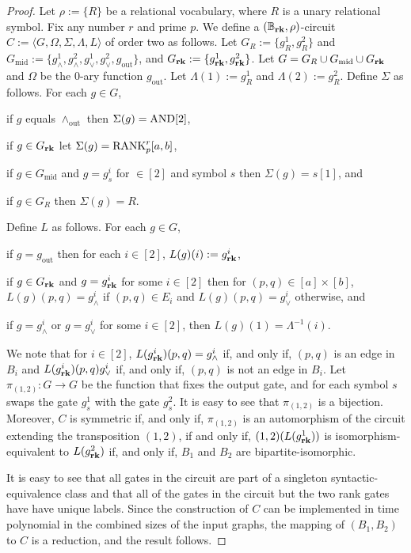 \documentclass[../paper.tex]{subfiles}
\begin{document}
\begin{proof}
  Let $\rho:= \{R\}$ be a relational vocabulary, where $R$ is a unary relational
  symbol. Fix any number $r$ and prime $p$. We define a $(\mathbb{B}_{\text{\textbf{rk}}}, \rho)$-circuit $C
  := \langle G, \Omega, \Sigma, \Lambda, L \rangle$ of order two as follows. Let
  $G_{R} := \{g^1_{R}, g^2_{R}\}$ and $G_{\text{mid}} := \{g^1_{\land},
  g^2_\land, g^1_\lor, g^2_\lor , g_{\text{out}}\}$, and $G_{\text{\textbf{rk}}} : = \{
  g^1_{\text{\textbf{rk}}}, g^2_{\text{\textbf{rk}}}\}$. Let $G = G_R \cup G_{\text{mid}} \cup G_{\text{\textbf{rk}}}$
  and $\Omega$ be the $0$-ary function $g_{\text{out}}$. Let $\Lambda(1) :=
  g^1_{R}$ and $\Lambda(2) := g^2_{R}$. Define $\Sigma$ as follows. For each $g
  \in G$,
  \begin{myitemize}
  \item if $g$ equals $\land_{\text{out}}$ then $\Sigma(g) = \text{\upshape AND}[2]$,
  \item if $g \in G_{\text{\textbf{rk}}}$ let $\Sigma(g) = \text{\upshape RANK}^r_p [a,b]$,
  \item if $g \in G_{\text{mid}}$ and $g = g^i_s$ for $ \in [2]$ and symbol $s$
    then $\Sigma(g) = s[1]$, and
  \item if $g \in G_R$ then $\Sigma(g) = R$.
  \end{myitemize}
  Define $L$ as follows. For each $g \in G$,
  \begin{myitemize}
  \item if $g = g_{\text{out}}$ then for each $i \in [2]$, $L(g)(i) :=
    g^i_{\text{\textbf{rk}}}$,
  \item if $g \in G_{\text{\textbf{rk}}}$ and $g = g^i_{\text{\textbf{rk}}}$ for some $i \in [2]$ then for
    $(p,q) \in [a]\times [b]$, $L(g)(p,q) = g^i_\land$ if $(p,q) \in E_i$ and
    $L(g)(p,q) = g^i_\lor$ otherwise, and
  \item if $g = g^i_\land$ or $g = g^i_{\lor}$ for some $i \in [2]$, then
    $L(g)(1) = \Lambda^{-1}(i)$.
  \end{myitemize}

  We note that for $i \in [2]$, $L(g^i_{\text{\textbf{rk}}})(p,q)= g^i_\land$ if, and only
  if, $(p,q)$ is an edge in $B_i$ and $L(g^i_{\text{\textbf{rk}}})(p,q) g^i_\lor$ if, and
  only if, $(p,q)$ is not an edge in $B_i$. Let $\pi_{(1,2)} : G \rightarrow G$
  be the function that fixes the output gate, and for each symbol $s$ swaps the
  gate $g^1_s$ with the gate $g^2_s$. It is easy to see that $\pi_{(1,2)}$ is a
  bijection. Moreover, $C$ is symmetric if, and only if, $\pi_{(1,2)}$ is an
  automorphism of the circuit extending the transposition $(1,2)$, if and only
  if, $(1,2) (L(g^1_{\text{\textbf{rk}}}))$ is isomorphism-equivalent to $L(g^2_{\text{\textbf{rk}}})$ if,
  and only if, $B_1$ and $B_2$ are bipartite-isomorphic.
 
  It is easy to see that all gates in the circuit are part of a singleton
  syntactic-equivalence class and that all of the gates in the circuit but the
  two rank gates have have unique labels. Since the construction of $C$ can be
  implemented in time polynomial in the combined sizes of the input graphs, the
  mapping of $(B_1, B_2)$ to $C$ is a reduction, and the result follows.
\end{proof}
\end{document}
